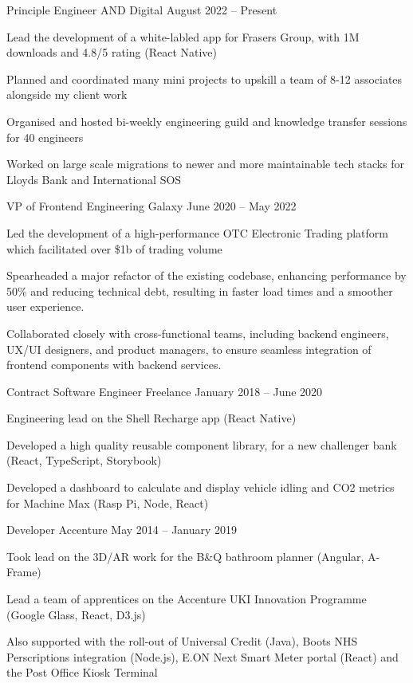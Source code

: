 \documentclass[]{resume-format}
\begin{document}
\begin{cventries}
    \cventry
    { Principle Engineer }
    { AND Digital }
    {}
    { August 2022 – Present }
    {\begin{cvitems}
        \item { Lead the development of a white-labled app for Frasers Group, with 1M downloads and 4.8/5 rating (React Native) }
        \item { Planned and coordinated many mini projects to upskill a team of 8-12 associates alongside my client work }
        \item { Organised and hosted bi-weekly engineering guild and knowledge transfer sessions for 40 engineers }
        \item { Worked on large scale migrations to newer and more maintainable tech stacks for Lloyds Bank and International SOS }
    \end{cvitems}}
    \cventry
    { VP of Frontend Engineering }
    { Galaxy }
    {}
    { June 2020 – May 2022 }
    {\begin{cvitems}
        \item { Led the development of a high-performance OTC Electronic Trading platform which facilitated over \$1b of trading volume }
        \item { Spearheaded a major refactor of the existing codebase, enhancing performance by 50\% and reducing technical debt, resulting in faster load times and a smoother user experience. }
        \item { Collaborated closely with cross-functional teams, including backend engineers, UX/UI designers, and product managers, to ensure seamless integration of frontend components with backend services. }
    \end{cvitems}}
    \cventry
    { Contract Software Engineer }
    { Freelance }
    {}
    { January 2018 – June 2020 }
    {\begin{cvitems}
        \item { Engineering lead on the Shell Recharge app (React Native) }
        \item { Developed a high quality reusable component library, for a new challenger bank (React, TypeScript, Storybook) }
        \item { Developed a dashboard to calculate and display vehicle idling and CO2 metrics for Machine Max (Rasp Pi, Node, React) }
    \end{cvitems}}
    \cventry
    { Developer }
    { Accenture }
    {}
    { May 2014 – January 2019 }
    {\begin{cvitems}
        \item { Took lead on the 3D/AR work for the B\&Q bathroom planner (Angular, A-Frame) }
        \item { Lead a team of apprentices on the Accenture UKI Innovation Programme (Google Glass, React, D3.js) }
        \item { Also supported with the roll-out of Universal Credit (Java), Boots NHS Perscriptions integration (Node.js), E.ON Next Smart Meter portal (React) and the Post Office Kiosk Terminal }
    \end{cvitems}}
\end{cventries}
\end{document}
